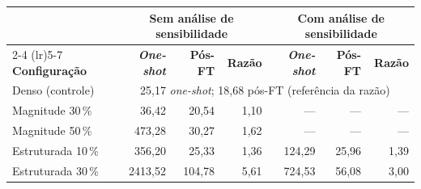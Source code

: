 \begin{tabular}{l rrr rrr}
\toprule
& \multicolumn{3}{c}{\textbf{Sem análise de sensibilidade}} & \multicolumn{3}{c}{\textbf{Com análise de sensibilidade}} \\
\cmidrule(lr){2-4} \cmidrule(lr){5-7}
\textbf{Configuração} & \textbf{\textit{One-shot}} & \textbf{Pós-FT} & \textbf{Razão} & \textbf{\textit{One-shot}} & \textbf{Pós-FT} & \textbf{Razão} \\
\midrule
Denso (controle) & \multicolumn{6}{c}{25,17 \textit{one-shot}; 18,68 pós-FT (referência da razão)} \\
\midrule
Magnitude 30\,\% & 36,42 & 20,54 & 1,10 & --- & --- & --- \\
Magnitude 50\,\% & 473,28 & 30,27 & 1,62 & --- & --- & --- \\
Estruturada 10\,\% & 356,20 & 25,33 & 1,36 & 124,29 & 25,96 & 1,39 \\
Estruturada 30\,\% & 2413,52 & 104,78 & 5,61 & 724,53 & 56,08 & 3,00 \\
\bottomrule
\end{tabular}
